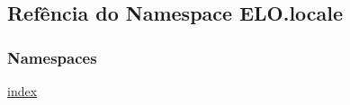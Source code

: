 \hypertarget{namespaceELO_1_1locale}{}\subsection{Refência do Namespace E\+L\+O.\+locale}
\label{namespaceELO_1_1locale}
\subsubsection*{Namespaces}
\begin{DoxyCompactItemize}
\item 
 \hyperlink{namespaceELO_1_1locale_1_1index}{index}
\end{DoxyCompactItemize}
